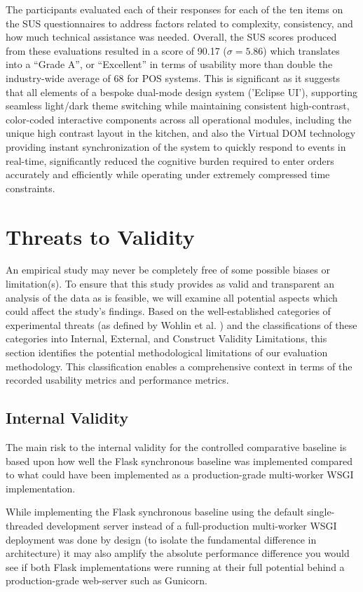 The participants evaluated each of their responses for each of the ten items on the SUS questionnaires to address factors related to complexity, consistency, and how much technical assistance was needed. Overall, the SUS scores produced from these evaluations resulted in a score of 90.17 ($\sigma = 5.86$) which translates into a ``Grade A'', or ``Excellent'' in terms of usability more than double the industry-wide average of 68 for POS systems. This is significant as it suggests that all elements of a bespoke dual-mode design system ('Eclipse UI'), supporting seamless light/dark theme switching while maintaining consistent high-contrast, color-coded interactive components across all operational modules, including the unique high contrast layout in the kitchen, and also the Virtual DOM technology providing instant synchronization of the system to quickly respond to events in real-time, significantly reduced the cognitive burden required to enter orders accurately and efficiently while operating under extremely compressed time constraints.
\section{Threats to Validity}
An empirical study may never be completely free of some possible biases or limitation(s). To ensure that this study provides as valid and transparent an analysis of the data as is feasible, we will examine all potential aspects which could affect the study's findings. Based on the well-established categories of experimental threats (as defined by Wohlin et al. \cite{wohlin2012threats}) and the classifications of these categories into Internal, External, and Construct Validity Limitations, this section identifies the potential methodological limitations of our evaluation methodology. This classification enables a comprehensive context in terms of the recorded usability metrics and performance metrics.
\subsection{Internal Validity}
The main risk to the internal validity for the controlled comparative baseline is based upon how well the Flask synchronous baseline was implemented compared to what could have been implemented as a production-grade multi-worker WSGI implementation.

While implementing the Flask synchronous baseline using the default single-threaded development server instead of a full-production multi-worker WSGI deployment was done by design (to isolate the fundamental difference in architecture) it may also amplify the absolute performance difference you would see if both Flask implementations were running at their full potential behind a production-grade web-server such as Gunicorn.

